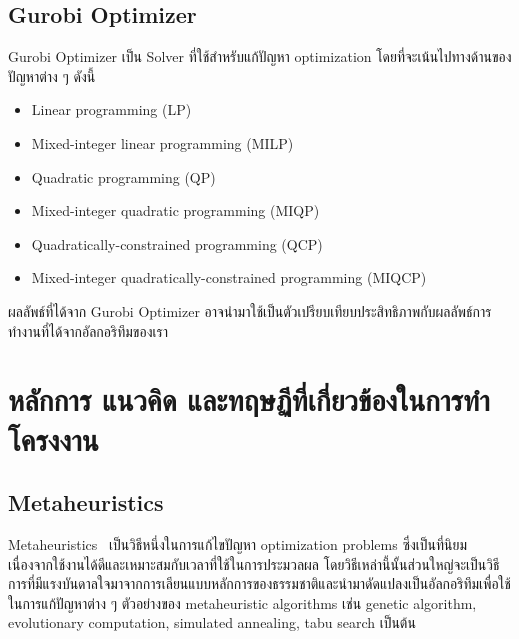 \subsection{Gurobi Optimizer}
Gurobi Optimizer เป็น Solver ที่ใช้สำหรับแก้ปัญหา optimization โดยที่จะเน้นไปทางด้านของปัญหาต่าง ๆ ดังนี้ 
\begin{itemize}
  \item Linear programming (LP)
  \item Mixed-integer linear programming (MILP)
  \item Quadratic programming (QP)
  \item Mixed-integer quadratic programming (MIQP)
  \item Quadratically-constrained programming (QCP)
  \item Mixed-integer quadratically-constrained programming (MIQCP)
\end{itemize}
ผลลัพธ์ที่ได้จาก Gurobi Optimizer อาจนำมาใช้เป็นตัวเปรียบเทียบประสิทธิภาพกับผลลัพธ์การทำงานที่ได้จากอัลกอริทึมของเรา
\fi

\section{หลักการ แนวคิด และทฤษฏีที่เกี่ยวข้องในการทำโครงงาน }
\subsection{Metaheuristics}
Meta­heuristics~\cite{metaheuris} เป็นวิธีหนึ่งในการแก้ไขปัญหา optimization problems ซึ่งเป็นที่นิยม เนื่องจากใช้งานได้ดีและเหมาะสมกับเวลาที่ใช้ในการประมวลผล
โดยวิธีเหล่านี้นั้นส่วนใหญ่จะเป็นวิธีการที่มีแรงบันดาลใจมาจากการเลียนแบบหลักการของธรรมชาติและนำมาดัดแปลงเป็นอัลกอริทึมเพื่อใช้ในการแก้ปัญหาต่าง ๆ ตัวอย่างของ metaheuristic algorithms เช่น genetic algorithm, evolutionary computation, simulated annealing, tabu search เป็นต้น

